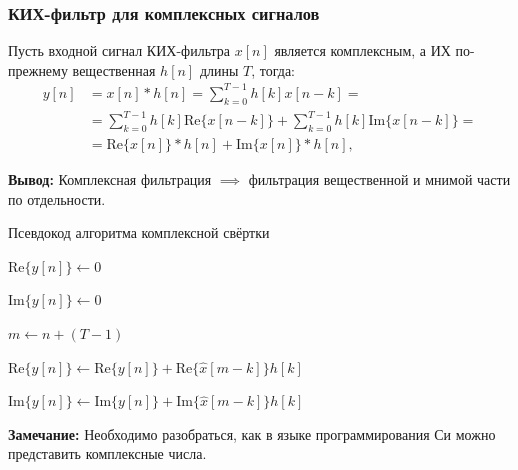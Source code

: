 \documentclass{beamer}
\begin{document}
    \begin{frame}
        \frametitle{КИХ-фильтр для комплексных сигналов}
        \justifying
        Пусть входной сигнал КИХ-фильтра $x[n]$ является комплексным, а ИХ по-прежнему вещественная $h[n]$ длины $T$, тогда:
        \begin{equation}
        \begin{split}
            y[n] &= x[n] * h[n] = \sum_{k = 0}^{T-1}h[k]x[n - k] = \\
                 &= \sum_{k = 0}^{T-1}h[k]\textrm{Re}\{x[n - k]\} + \sum_{k = 0}^{T-1}h[k]\textrm{Im}\{x[n - k]\} = \\
                 &= \textrm{Re}\{x[n]\} * h[n] + \textrm{Im}\{x[n]\} * h[n], \label{eq:cconv}
        \end{split}
        \end{equation}
        \par
        {\bf Вывод:} Комплексная фильтрация $\implies$ фильтрация вещественной и мнимой части по отдельности.
        \par
    \end{frame}
    \begin{frame}{Псевдокод алгоритма комплексной свёртки}
        \begin{algorithm}[H]
            \BlankLine
            {
                $\textrm{Re}\{y[n]\} \leftarrow 0$
                \par
                $\textrm{Im}\{y[n]\} \leftarrow 0$
                \par
                $m \leftarrow n + (T - 1)$
                \par
                {
                    $\textrm{Re}\{y[n]\}  \leftarrow \textrm{Re}\{y[n]\} + \textrm{Re}\{\hat x[m - k]\} h[k]$
                    \par
                    $\textrm{Im}\{y[n]\}  \leftarrow \textrm{Im}\{y[n]\}+ \textrm{Im}\{\hat x[m - k]\} h[k]$
                }
            }
        \end{algorithm}
        {\bf Замечание:} Необходимо разобраться, как в языке программирования Си можно представить комплексные числа.
    \end{frame}
\end{document}
